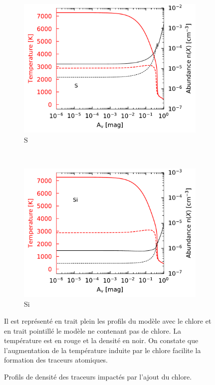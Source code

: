 \begin{appendices}
\begin{figure}[!h]
    \begin{subfigure}[t]{0.49\textwidth} %
        \centering \includegraphics[trim = {0 0 0 0},clip,width=1\textwidth]{figure/Cl/gridModelEmiss/nT_comp_S.pdf}
        \caption{$\mathrm{S}$}
    \end{subfigure}
    ~
    \begin{subfigure}[t]{0.49\textwidth} %
        \centering \includegraphics[trim = {0 0 0 0},clip,width=1\textwidth]{figure/Cl/gridModelEmiss/nT_comp_Si.pdf}
        \caption{$\mathrm{Si}$}
    \end{subfigure}
    
    \caption{Profils de densité des traceurs impactés par l'ajout du chlore.}
    \begin{minipage}{\textwidth}
    Il est représenté en trait plein les profils du modèle avec le chlore et en trait pointillé le modèle ne contenant pas de chlore. La température est en rouge et la densité en noir. On constate que l'augmentation de la température induite par le chlore facilite la formation des traceurs atomiques. 
    \end{minipage}
    \label{fig:Cl:gridModelEmiss:nT:yes}
\end{figure}


\end{appendices}
